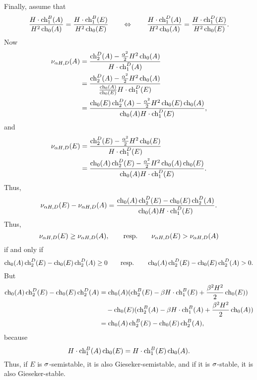 \documentclass[letterpaper,10pt]{article}
\begin{document}
Finally, assume that 
\[ \frac{H \cdot \ch_1^B(A)}{H^2 \ch_0(A)} = \frac{H \cdot \ch_1^B(E)}{H^2 \ch_0(E)} \qquad \Leftrightarrow \qquad \frac{H \cdot \ch_1^D(A)}{H^2 \ch_0(A)} = \frac{H \cdot \ch_1^D(E)}{H^2 \ch_0(E)}. \]
Now
\begin{align*}
    \nu_{\al H, D}(A) & = \frac{\ch_2^D(A) - \frac{\al^2}{2} H^2 \ch_0(A)}{H\cdot \ch_1^D(A)} \\
    & = \frac{\ch_2^D(A) - \frac{\al^2}{2} H^2 \ch_0(A)}{\frac{\ch_0(A)}{\ch_0(E)} H\cdot \ch_1^D(E)} \\
    & = \frac{\ch_0(E) \ch_2^D(A) - \frac{\al^2}{2} H^2 \ch_0(E) \ch_0(A)}{\ch_0(A) H\cdot \ch_1^D(E)},
\end{align*}
and
\begin{align*}
    \nu_{\al H, D}(E) & = \frac{\ch_2^D(E) - \frac{\al^2}{2} H^2 \ch_0(E)}{H\cdot \ch_1^D(E)} \\
    & =\frac{\ch_0(A) \ch_2^D(E) - \frac{\al^2}{2} H^2 \ch_0(A) \ch_0(E)}{\ch_0(A) H\cdot \ch_1^D(E)}.
\end{align*}
Thus,
\[ \nu_{\al H, D}(E) - \nu_{\al H, D}(A) = \frac{\ch_0(A) \ch_2^D(E) - \ch_0(E) \ch_2^D(A)}{\ch_0(A) H\cdot \ch_1^D(E)}. \]
Thus,
\[ \nu_{\al H, D}(E) \ge \nu_{\al H, D}(A), \qquad \mathrm{resp.} \qquad \nu_{\al H, D}(E) > \nu_{\al H, D}(A) \]
if and only if
\[ \ch_0(A) \ch_2^D(E) - \ch_0(E) \ch_2^D(A) \ge 0 \qquad \mathrm{resp.} \qquad \ch_0(A) \ch_2^D(E) - \ch_0(E) \ch_2^D(A) > 0. \]
But
\begin{align*}
    \ch_0(A) \ch_2^D(E) - \ch_0(E) \ch_2^D(A) & = \ch_0(A) (\ch_2^B(E) - \be H\cdot \ch_1^B(E) + \frac{\be^2 H^2}{2} \ch_0(E)) \\
    & \quad - \ch_0(E) (\ch_2^B(A) - \be H\cdot \ch_1^B(A) + \frac{\be^2 H^2}{2} \ch_0(A)) \\
    & = \ch_0(A) \ch_2^B(E) - \ch_0(E) \ch_2^B(A),
\end{align*}
because 
\[ H \cdot \ch_1^B(A) \ch_0(E) =  H \cdot \ch_1^B(E) \ch_0(A). \]
Thus, if $E$ is $\si$-semistable, it is also Gieseker-semistable, and if it is $\si$-stable, it is also Gieseker-stable.
\end{document}
